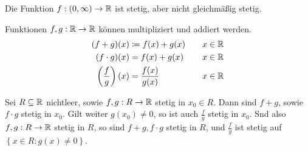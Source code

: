 \begin{subexample}
	Die Funktion $ f: (0, \infty) \to \mathbb{R}  $ ist stetig, aber nicht gleichmäßig stetig.
\end{subexample}

Funktionen $ f,g: \mathbb{R} \to \mathbb{R}  $ können multipliziert und addiert werden.
\begin{alignat*}{3}
	(f + g)(x) &\coloneqq f(x) + g(x) && \quad x \in \mathbb{R} \\
	(f \cdot g)(x) &= f(x) + g(x) && \quad x \in \mathbb{R} \\
	\left ( \frac{ f }{ g }  \right) (x) &= \frac{ f(x) }{ g(x) } && \quad x \in \mathbb{R}  \\
\end{alignat*}

\begin{subtheorem}
	Sei $ R \subseteq \mathbb{R}  $ nichtleer, sowie $ f,g: R \to \mathbb{R}  $ stetig in $ x_0 \in R $.
	Dann sind $ f+g $, sowie $ f\cdot g $ stetig in $ x_0 $.
	Gilt weiter $ g(x_0) \neq 0 $, so ist auch $ \frac{ f }{ g }  $ stetig in $ x_0 $.
	Snd also $ f,g: R\to \mathbb{R}  $ stetig in $ R $, so sind $ f+g, f\cdot g $ stetig in $ R $,
	und $ \frac{ f }{ g }  $ ist stetig auf $ \left\{ x \in R: g(x) \neq 0 \right\}  $.
\end{subtheorem}

